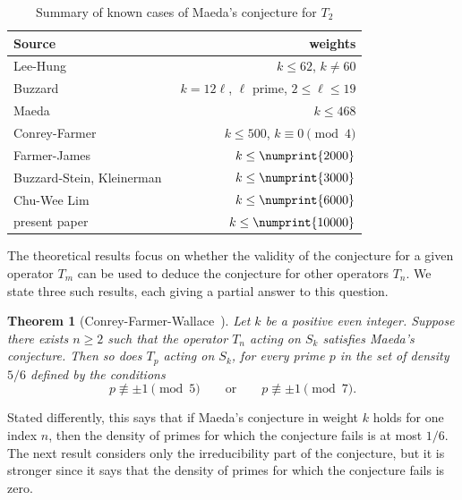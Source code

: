 \documentclass[11pt]{article}
\theoremstyle{plain}
\newtheorem{theorem}{Theorem}[section]
\theoremstyle{definition}
\theoremstyle{remark}
\numberwithin{equation}{section}
\newcommand{\bound}{\numprint{10000}}
\begin{document}
\begin{table}[h]
  \begin{center}
\begin{tabular}{l|r}
  Source & weights\\ \hline
  Lee-Hung~\cite{LeeHung} & $k\leq 62$, $k\neq 60$ \\
  Buzzard~\cite{Buzzard} & $k=12\ell$, $\ell$ prime, $2\leq\ell\leq 19$ \\
  Maeda~\cite{HidaMaeda} & $k\leq 468$ \\
  Conrey-Farmer~\cite{ConreyFarmer} & $k\leq 500$, $k\equiv 0\pmod 4$  \\
  Farmer-James~\cite{FarmerJames} & $k\leq \numprint{2000}$  \\
  Buzzard-Stein, Kleinerman~\cite{Kleinerman} & $k\leq\numprint{3000}$ \\
  Chu-Wee Lim~\cite{Lim} & $k\leq\numprint{6000}$ \\
  present paper & $k\leq\bound$  \\
\end{tabular}
\end{center}
\caption{Summary of known cases of Maeda's conjecture for $T_2$}
\label{tbl:known}
\end{table}

The theoretical results focus on whether the validity of the conjecture for
a given operator $T_m$ can be used to deduce the conjecture for other
operators $T_n$.  We state three such results, each giving a partial answer to
this question.

\begin{theorem}[Conrey-Farmer-Wallace~\cite{ConreyFarmerWallace}]
  \label{thm:CFW}
  Let $k$ be a positive even integer.  Suppose there exists $n\geq 2$ such
  that the operator $T_n$ acting on $S_k$ satisfies Maeda's conjecture.  Then
  so does $T_p$ acting on $S_k$, for every prime $p$ in the set of density
  $5/6$ defined by the conditions
  \begin{equation*}
    p\not\equiv \pm 1\pmod{5}\qquad\text{or}\qquad
    p\not\equiv \pm 1\pmod{7}.
  \end{equation*}
\end{theorem}

Stated differently, this says that if Maeda's conjecture in weight $k$ holds
for one index $n$, then the density of primes for which the conjecture
fails is at most $1/6$.  The next result considers only the irreducibility
part of the conjecture, but it is stronger since it says that the density of
primes for which the conjecture fails is zero.
\end{document}
